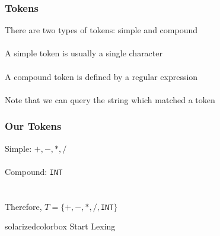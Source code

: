 \documentclass[aspectratio=169]{beamer}
\begin{document}
\begin{frame}
\frametitle{Tokens}

There are two types of tokens: simple and compound\\~\\

A \alert{simple token} is usually a single character\\~\\

A \alert{compound token} is defined by a \alert{regular expression}\\~\\

Note that we can query the string which matched a token
\end{frame}

\begin{frame}
\frametitle{Our Tokens}

Simple: $+, -, *, /$\\~\\

Compound: \lstinline{INT}\\~\\~\\

Therefore, $T = \{ +, -, *, /,$\lstinline{INT}$\}$
\end{frame}

\begin{frame}
  \begin{beamercolorbox}[wd=\paperwidth, sep=2em]{solarizedcolorbox}
    { \hfill Start Lexing}
  \end{beamercolorbox}
\end{frame}
\end{document}
